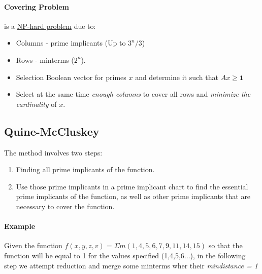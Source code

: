\paragraph{Covering Problem} is a \underline{NP-hard problem} due to:
\begin{itemize}
	\item Columns - prime implicants (Up to $3^{n}/3$)
	\item Rows - minterms ($2^{n}$).
	\item Selection Boolean vector for primes $x$ and determine it such that $Ax \geqslant \textbf{1}$ 
	\item Select at the same time \textit{enough columns} to cover all rows and \textit{minimize the cardinality} of $x$.
\end{itemize}
\subsection{Quine-McCluskey}
The method involves two steps:
\begin{enumerate}
	\item Finding all prime implicants of the function.
	\item Use those prime implicants in a prime implicant chart to find the essential prime implicants of the function, as well as other prime implicants that are necessary to cover the function.
\end{enumerate} 
\paragraph{Example} Given the function $ f(x,y,z,v) = \Sigma m(1,4,5,6,7,9,11,14,15) $ so that the function will be equal to 1 for the values specified (1,4,5,6...), in the following step we attempt reduction and merge some minterms wher their \textit{mindistance  = 1}

